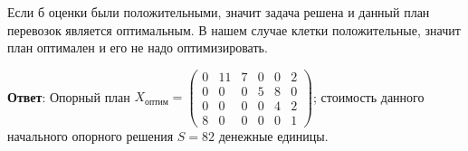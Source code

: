 Если б оценки были положительными, значит задача решена и данный план перевозок является оптимальным.
В нашем случае клетки положительные, значит план оптимален и его не надо оптимизировать.

\textbf{Ответ}:
Опорный план
$X_\text{оптим}= \begin{pmatrix}
  0 &11 &7  &0  &0  &2\\
  0 &0  &0  &5  &8  &0\\
  0 &0  &0  &0  &4  &2\\
  8 &0  &0  &0  &0  &1
\end{pmatrix}$;
стоимость данного начального опорного решения $S = 82$ денежные единицы.














